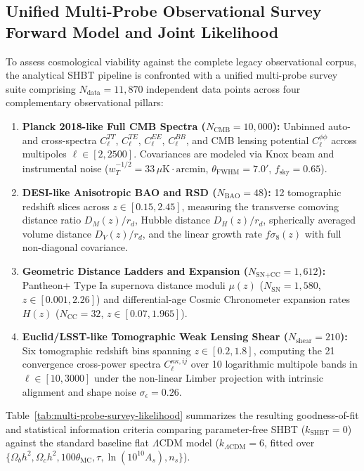 \documentclass[11pt,letterpaper]{article}
\theoremstyle{plain}
\begin{document}
\subsection{Unified Multi-Probe Observational Survey Forward Model and Joint Likelihood}
\label{sec:multi-probe-survey-likelihood}

To assess cosmological viability against the complete legacy observational corpus, the analytical SHBT pipeline is confronted with a unified multi-probe survey suite comprising $N_{\text{data}} = 11{,}870$ independent data points across four complementary observational pillars:
\begin{enumerate}
\item[(i)] \textbf{Planck 2018-like Full CMB Spectra ($N_{\text{CMB}} = 10{,}000$):} Unbinned auto- and cross-spectra $C_\ell^{TT}$, $C_\ell^{TE}$, $C_\ell^{EE}$, $C_\ell^{BB}$, and CMB lensing potential $C_\ell^{\phi\phi}$ across multipoles $\ell \in [2, 2500]$. Covariances are modeled via Knox beam and instrumental noise ($w_T^{-1/2} = 33\,\mu\text{K}\cdot\text{arcmin}$, $\theta_{\text{FWHM}} = 7.0'$, $f_{\text{sky}} = 0.65$).
\item[(ii)] \textbf{DESI-like Anisotropic BAO and RSD ($N_{\text{BAO}} = 48$):} 12 tomographic redshift slices across $z \in [0.15, 2.45]$, measuring the transverse comoving distance ratio $D_M(z)/r_d$, Hubble distance $D_H(z)/r_d$, spherically averaged volume distance $D_V(z)/r_d$, and the linear growth rate $f\sigma_8(z)$ with full non-diagonal covariance.
\item[(iii)] \textbf{Geometric Distance Ladders and Expansion ($N_{\text{SN+CC}} = 1{,}612$):} Pantheon+ Type Ia supernova distance moduli $\mu(z)$ ($N_{\text{SN}} = 1{,}580$, $z \in [0.001, 2.26]$) and differential-age Cosmic Chronometer expansion rates $H(z)$ ($N_{\text{CC}} = 32$, $z \in [0.07, 1.965]$).
\item[(iv)] \textbf{Euclid/LSST-like Tomographic Weak Lensing Shear ($N_{\text{shear}} = 210$):} Six tomographic redshift bins spanning $z \in [0.2, 1.8]$, computing the 21 convergence cross-power spectra $C_\ell^{\kappa\kappa, ij}$ over 10 logarithmic multipole bands in $\ell \in [10, 3000]$ under the non-linear Limber projection with intrinsic alignment and shape noise $\sigma_\epsilon = 0.26$.
\end{enumerate}

Table~\ref{tab:multi-probe-survey-likelihood} summarizes the resulting goodness-of-fit and statistical information criteria comparing parameter-free SHBT ($k_{\text{SHBT}} = 0$) against the standard baseline flat $\Lambda\text{CDM}$ model ($k_{\Lambda\text{CDM}} = 6$, fitted over $\{\Omega_b h^2, \Omega_c h^2, 100\theta_{\text{MC}}, \tau, \ln(10^{10}A_s), n_s\}$).
\end{document}
